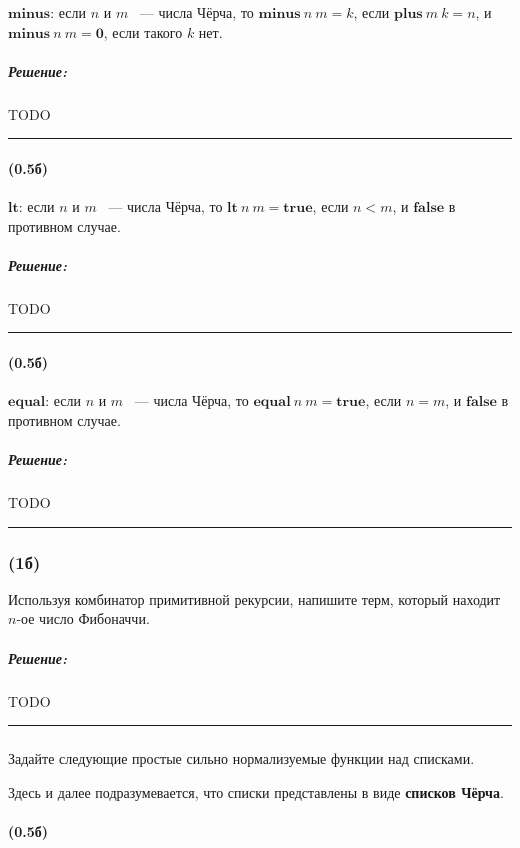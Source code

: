 \documentclass{article}
\newenvironment{proof}{\subparagraph{\hspace{-1em}Решение:\newline}}{\par\noindent\rule{\textwidth}{0.4pt}}
\newcommand{\term}[1]{\mathbf{#1}}
\begin{document}
    $\term{minus}$: если $n$ и $m$ ~--- числа Чёрча, то $\term{minus}~n~m = k$,
    если $\term{plus}~m~k = n$, и $\term{minus}~n~m = \term{0}$, если такого $k$
    нет.

    \begin{proof}
        TODO %
    \end{proof}

    \paragraph{(0.5б)}

    $\term{lt}$: если $n$ и $m$ ~--- числа Чёрча, то $\term{lt}~n~m = \term{true}$, если $n < m$, и $\term{false}$ в противном случае.

    \begin{proof}
        TODO %
    \end{proof}

    \paragraph{(0.5б)}

    $\term{equal}$: если $n$ и $m$ ~--- числа Чёрча, то $\term{equal}~n~m = \term{true}$, если $n = m$, и $\term{false}$ в противном случае.

    \begin{proof}
        TODO %
    \end{proof}

    \subsubsection{(1б)}

    Используя комбинатор примитивной рекурсии, напишите терм, который
    находит $n$-ое число Фибоначчи.

    \begin{proof}
        TODO %
    \end{proof}

    \subsubsection{}

    Задайте следующие простые сильно нормализуемые функции над списками.

    Здесь и далее подразумевается, что списки представлены в виде \textbf{списков Чёрча}.

    \paragraph{(0.5б)}
\end{document}
